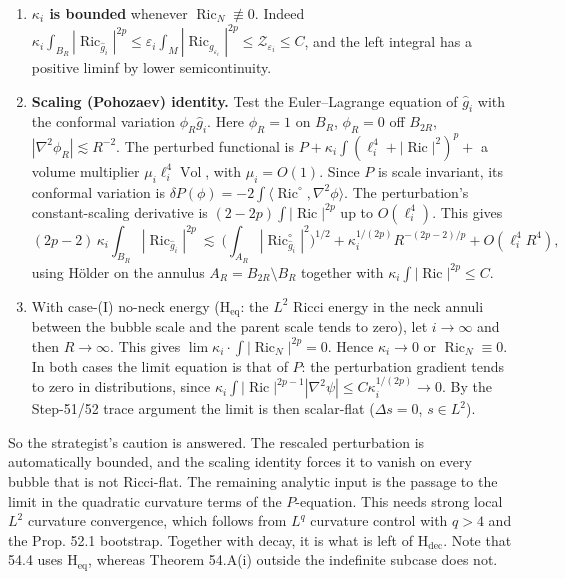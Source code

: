 \documentclass[
  10pt,
]{report}
\renewcommand{\backslash}{\mathord{\text{\textbackslash}}}%
\renewcommand{\setminus}{\mathbin{\backslash}}}
\begin{document}
\begin{enumerate}
\def\labelenumi{(\alph{enumi})}
\item
  \textbf{\(\kappa_i\) is bounded} whenever
  \(\operatorname{Ric}_N\not\equiv0\). Indeed
  \(\kappa_i\int_{B_R}|\operatorname{Ric}_{\hat g_i}|^{2p}\le\varepsilon_i\int_M|\operatorname{Ric}_{g_{\varepsilon_i}}|^{2p}\le\mathcal Z_{\varepsilon_i}\le C\),
  and the left integral has a positive liminf by lower semicontinuity.
\item
  \textbf{Scaling (Pohozaev) identity.} Test the Euler--Lagrange
  equation of \(\hat g_i\) with the conformal variation
  \(\phi_R\hat g_i\). Here \(\phi_R=1\) on \(B_R\), \(\phi_R=0\) off
  \(B_{2R}\), \(|\nabla^2\phi_R|\lesssim R^{-2}\). The perturbed
  functional is \(P+\kappa_i\int(\ell_i^4+|\operatorname{Ric}|^2)^p+\) a
  volume multiplier \(\mu_i\ell_i^4\operatorname{Vol}\), with
  \(\mu_i=O(1)\). Since \(P\) is scale invariant, its conformal
  variation is
  \(\delta P(\phi)=-2\int\langle\operatorname{Ric}^\circ,\nabla^2\phi\rangle\).
  The perturbation's constant-scaling derivative is
  \((2-2p)\int|\operatorname{Ric}|^{2p}\) up to \(O(\ell_i^4)\). This
  gives \[
  (2p-2)\,\kappa_i\!\int_{B_R}\!|\operatorname{Ric}_{\hat g_i}|^{2p}
  \ \lesssim\ \Big(\int_{A_R}|\operatorname{Ric}^\circ_{\hat g_i}|^2\Big)^{1/2}
  +\kappa_i^{1/(2p)}R^{-(2p-2)/p}+O(\ell_i^4R^4),
  \] using Hölder on the annulus \(A_R=B_{2R}\setminus B_R\) together
  with \(\kappa_i\int|\operatorname{Ric}|^{2p}\le C\).
\item
  With case-(I) no-neck energy (\(\mathrm{H_{eq}}\): the \(L^2\) Ricci
  energy in the neck annuli between the bubble scale and the parent
  scale tends to zero), let \(i\to\infty\) and then \(R\to\infty\). This
  gives \(\lim\kappa_i\cdot\int|\operatorname{Ric}_N|^{2p}=0\). Hence
  \(\kappa_i\to0\) or \(\operatorname{Ric}_N\equiv0\). In both cases the
  limit equation is that of \(P\): the perturbation gradient tends to
  zero in distributions, since
  \(\kappa_i\int|\operatorname{Ric}|^{2p-1}|\nabla^2\psi|\le C\kappa_i^{1/(2p)}\to0\).
  By the Step-51/52 trace argument the limit is then scalar-flat
  (\(\Delta s=0\), \(s\in L^2\)).
\end{enumerate}

So the strategist's caution is answered. The rescaled perturbation is
automatically bounded, and the scaling identity forces it to vanish on
every bubble that is not Ricci-flat. The remaining analytic input is the
passage to the limit in the quadratic curvature terms of the
\(P\)-equation. This needs strong local \(L^2\) curvature convergence,
which follows from \(L^q\) curvature control with \(q>4\) and the Prop.
52.1 bootstrap. Together with decay, it is what is left of
\(\mathrm{H_{dec}}\). Note that 54.4 uses \(\mathrm{H_{eq}}\), whereas
Theorem 54.A(i) outside the indefinite subcase does not.
\end{document}
